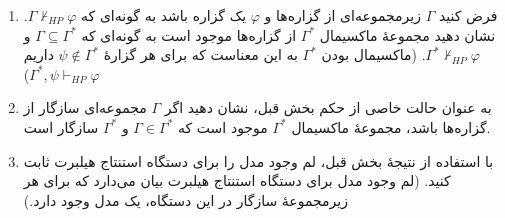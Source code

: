 \begin{enumerate}[label=(\alph*)]
    \item فرض کنید $\Gamma$ زیرمجموعه‌ای از گزاره‌ها و $\varphi$ یک گزاره باشد به گونه‌ای که $\Gamma \not\vdash_{HP} \varphi$. نشان دهید مجموعهٔ ماکسیمال $\Gamma^*$ از گزاره‌ها موجود است به گونه‌ای که $\Gamma \subseteq \Gamma^*$ و $\Gamma^* \not\vdash_{HP} \varphi$. (ماکسیمال بودن $\Gamma^*$ به این معناست که برای هر گزارهٔ $\psi \not\in \Gamma^*$ داریم $\Gamma^*,\psi \vdash_{HP} \varphi$)
    \item به عنوان حالت خاصی از حکم بخش قبل، نشان دهید اگر $\Gamma$ مجموعه‌ای سازگار از گزاره‌ها باشد، مجموعهٔ ماکسیمال $\Gamma^*$ موجود است که $\Gamma \in \Gamma^*$ و $\Gamma^*$ سازگار است.
    \item با استفاده از نتیجهٔ بخش قبل، لم وجود مدل را برای دستگاه استنتاج هیلبرت ثابت کنید. (لم وجود مدل برای دستگاه استنتاج هیلبرت بیان می‌دارد که برای هر زیرمجموعهٔ سازگار در این دستگاه، یک مدل وجود دارد.)
\end{enumerate}
